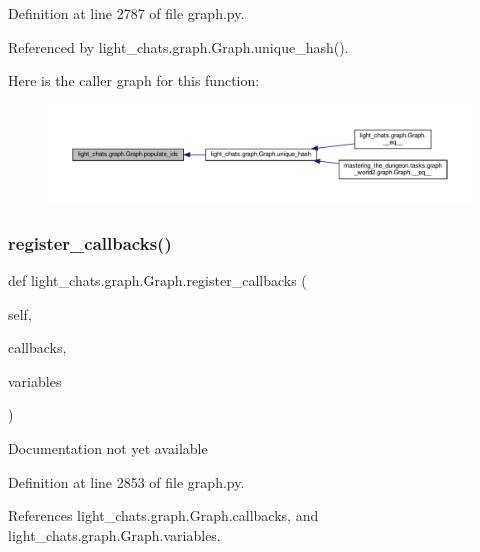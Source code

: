 Definition at line 2787 of file graph.\+py.



Referenced by light\+\_\+chats.\+graph.\+Graph.\+unique\+\_\+hash().

Here is the caller graph for this function\+:
\nopagebreak
\begin{figure}[H]
\begin{center}
\leavevmode
\includegraphics[width=350pt]{classlight__chats_1_1graph_1_1Graph_a604091edb800be1aad16f3a64f13d6da_icgraph}
\end{center}
\end{figure}
\mbox{\label{classlight__chats_1_1graph_1_1Graph_aa40b8fea9737da5d3f329dfb00c42c6f}} 
\subsubsection{\texorpdfstring{register\+\_\+callbacks()}{register\_callbacks()}}
{\footnotesize\ttfamily def light\+\_\+chats.\+graph.\+Graph.\+register\+\_\+callbacks (\begin{DoxyParamCaption}\item[{}]{self,  }\item[{}]{callbacks,  }\item[{}]{variables }\end{DoxyParamCaption})}

\begin{DoxyVerb}Documentation not yet available\end{DoxyVerb}
 

Definition at line 2853 of file graph.\+py.



References light\+\_\+chats.\+graph.\+Graph.\+callbacks, and light\+\_\+chats.\+graph.\+Graph.\+variables.

\mbox{\label{classlight__chats_1_1graph_1_1Graph_ab799f6160a4e8dd1550b2e245cdd2d53}} 
